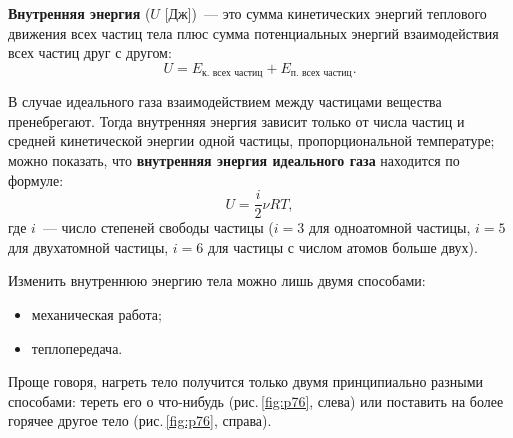 \documentclass[main.tex]{subfiles}
\begin{document}
\textbf{Внутренняя энергия} ($U$ [Дж])~--- это сумма кинетических энергий теплового движения всех частиц тела плюс сумма потенциальных энергий взаимодействия всех частиц друг с другом:
\begin{equation}
    U=E_\text{к. всех частиц}+E_\text{п. всех частиц}.
\end{equation}

В случае идеального газа взаимодействием между частицами вещества пренебрегают. Тогда внутренняя энергия зависит только от числа частиц и средней кинетической энергии одной частицы, пропорциональной температуре; можно показать, что \textbf{внутренняя энергия идеального газа} находится по формуле:
\begin{equation}
    U=\frac{i}{2}\nu RT,
\end{equation}
где $i$~--- число степеней свободы частицы ($i=3$ для одноатомной частицы, $i=5$ для двухатомной частицы, $i=6$ для частицы с числом атомов больше двух).

Изменить внутреннюю энергию тела можно лишь двумя способами:
\begin{itemize}
    \item механическая работа; 
    \item теплопередача. 
\end{itemize}
Проще говоря, нагреть тело получится только двумя принципиально разными способами: тереть его о что-нибудь (рис.\,\ref{fig:p76}, слева) или поставить на более горячее другое тело (рис.\,\ref{fig:p76}, справа).
\end{document}

